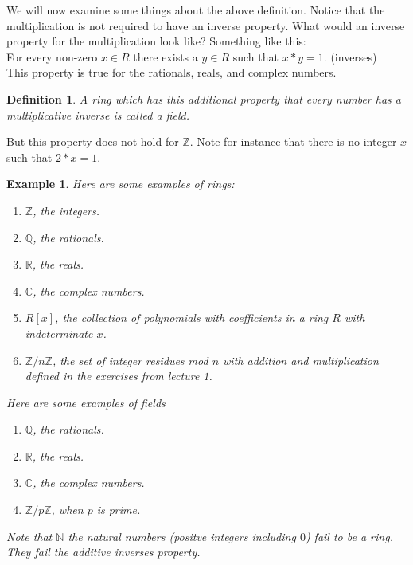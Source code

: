 \documentclass{article}
\theoremstyle{problemstyle}
\newtheorem{example}{Example}
\newtheorem{definition}{Definition}
\begin{document}
We will now examine some things about the above definition. Notice that the multiplication is not required to have an inverse property. What would an inverse property for the multiplication look like? Something like this:\\

For every non-zero $x \in R$ there exists a $y \in R$ such that $x*y  = 1$. (inverses)\\

This property is true for the rationals, reals, and complex numbers. 

\begin{definition}
A ring which has this additional property that every number has a multiplicative inverse is called a field.
\end{definition}

But this property does not hold for $\mathbb{Z}$. Note for instance that there is no integer $x$ such that $2*x = 1$.\\

\begin{example}
Here are some examples of rings: 
\begin{enumerate}
\item $\mathbb{Z}$, the integers. 
\item $\mathbb{Q}$, the rationals. 
\item $\mathbb{R}$, the reals. 
\item $\mathbb{C}$, the complex numbers. 
\item $R[x]$, the collection of polynomials with coefficients in a ring $R$ with indeterminate $x$.
\item $\mathbb{Z}/n\mathbb{Z}$, the set of integer residues mod $n$ with addition and multiplication defined in the exercises from lecture 1. 
\end{enumerate}

Here are some examples of fields

\begin{enumerate}
\item $\mathbb{Q}$, the rationals. 
\item $\mathbb{R}$, the reals. 
\item $\mathbb{C}$, the complex numbers. 
\item $\mathbb{Z}/p\mathbb{Z}$, when $p$ is prime. 
\end{enumerate}

Note that $\mathbb{N}$ the natural numbers (positve integers including $0$) fail to be a ring. They fail the additive inverses property.\\

\end{example}
\end{document}
